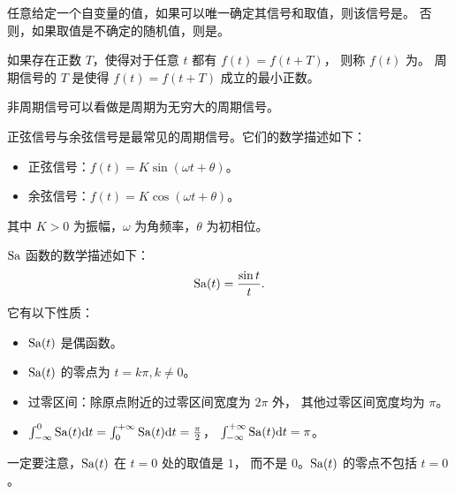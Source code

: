 \begin{definition}[确定信号与随机信号]
    任意给定一个自变量的值，如果可以唯一确定其信号和取值，则该信号是。
    否则，如果取值是不确定的随机值，则是。
\end{definition}

\begin{definition}[周期信号]
    如果存在正数 $T$，使得对于任意 $t$ 都有 $f(t) = f(t + T)$，
    则称 $f(t)$ 为。
    周期信号的 $T$ 是使得 $f(t) = f(t + T)$ 成立的最小正数。
\end{definition}

\begin{remark}
    非周期信号可以看做是周期为无穷大的周期信号。
\end{remark}

\begin{example}[正弦信号与余弦信号]
    正弦信号与余弦信号是最常见的周期信号。它们的数学描述如下：
    \begin{itemize}
        \item 正弦信号：$f(t) = K\sin(\omega t + \theta)$。
        \item 余弦信号：$f(t) = K\cos(\omega t + \theta)$。
    \end{itemize}
    其中 $K > 0$ 为振幅，$\omega$ 为角频率，$\theta$ 为初相位。
\end{example}

\begin{example}[$\sa$ 函数]
    $\sa$ 函数的数学描述如下：
    \begin{align*}
        \mathrm{Sa}(t) = \frac{\sin t}{t}.
    \end{align*}
    它有以下性质：
    \begin{itemize}
        \item $\mathrm{Sa}(t)$ 是偶函数。
        \item $\mathrm{Sa}(t)$ 的零点为 $t = k\pi, k \ne 0$。
        \item 过零区间：除原点附近的过零区间宽度为 $2\pi$ 外，
            其他过零区间宽度均为 $\pi$。
        \item $\int_{-\infty}^{0}\mathrm{Sa}(t)\mathrm{d}t = \int_{0}^{+\infty}\mathrm{Sa}(t)\mathrm{d}t = \frac{\pi}{2}$，
            $\int_{-\infty}^{+\infty}\mathrm{Sa}(t)\mathrm{d}t = \pi$。
    \end{itemize}
\end{example}

\begin{note}
    一定要注意，$\mathrm{Sa}(t)$ 在 $t = 0$ 处的取值是 $1$，
    而不是 $0$。$\mathrm{Sa}(t)$ 的零点不包括 $t = 0$。
\end{note}

